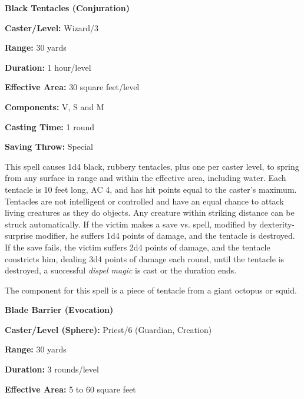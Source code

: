\begin{multicols}{2}
\vspace{1em}

\noindent
\begin{minipage}{\columnwidth}

\noindent \textbf{Black Tentacles (Conjuration)}

\noindent \textbf{Caster/Level:} Wizard/3

\noindent \textbf{Range:} 30 yards

\noindent \textbf{Duration:} 1 hour/level

\noindent \textbf{Effective Area:} 30 square feet/level

\noindent \textbf{Components:} V, S and M

\noindent \textbf{Casting Time:} 1 round

\noindent \textbf{Saving Throw:} Special

\end{minipage}

This spell causes 1d4 black, rubbery tentacles, plus one per caster level, to spring from any surface in range and within the effective area, including water.  Each tentacle is 10 feet long, AC 4, and has hit points equal to the caster's maximum.  Tentacles are not intelligent or controlled and have an equal chance to attack living creatures as they do objects.  Any creature within striking distance can be struck automatically.  If the victim makes a save vs. spell, modified by dexterity-surprise modifier, he suffers 1d4 points of damage, and the tentacle is destroyed.  If the save fails, the victim suffers 2d4 points of damage, and the tentacle constricts him, dealing 3d4 points of damage each round, until the tentacle is destroyed, a successful \textit{dispel magic} is cast or the duration ends.  

The component for this spell is a piece of tentacle from a giant octopus or squid.

\vspace{1em}

\noindent
\begin{minipage}{\columnwidth}

\noindent \textbf{Blade Barrier (Evocation)}

\noindent \textbf{Caster/Level (Sphere):} Priest/6 (Guardian, Creation)

\noindent \textbf{Range:} 30 yards

\noindent \textbf{Duration:} 3 rounds/level

\noindent \textbf{Effective Area:} 5 to 60 square feet


\end{minipage}
\end{multicols}
